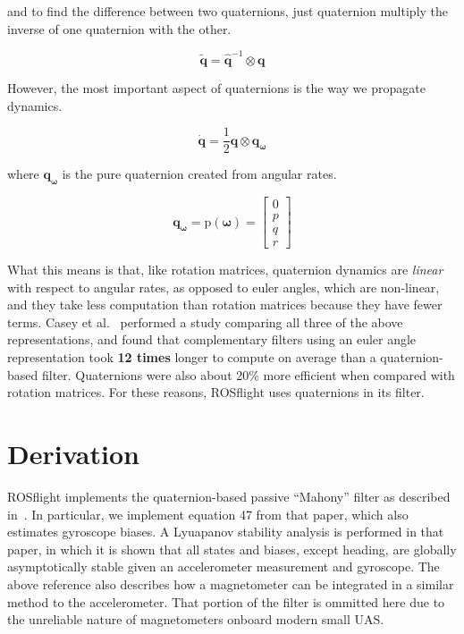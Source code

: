 \documentclass[paper=a4, fontsize=11pt]{scrartcl} %
\numberwithin{equation}{section} %
\numberwithin{figure}{section} %
\numberwithin{table}{section} %
\begin{document}
and to find the difference between two quaternions, just quaternion multiply the inverse of one quaternion with the other.

\begin{equation}
	\tilde{\bm{q}} = \hat{\bm{q}}^{-1} \otimes \bm{q}
\end{equation}

However, the most important aspect of quaternions is the way we propagate dynamics.

\begin{equation}
	\dot{\bm{q}} = \frac{1}{2} \bm{q} \otimes \bm{q_{\omega}}
\end{equation}

where $\bm{q_{\omega}}$ is the pure quaternion created from angular rates.

\begin{equation}
	\bm{q_{\omega}} = \textrm{p}(\bm{\omega}) =
			  \begin{bmatrix}
				0 \\
				p \\
				q \\
				r 
			 \end{bmatrix} 
\end{equation}

What this means is that, like rotation matrices, quaternion dynamics are \textit{linear} with respect to angular rates, as opposed to euler angles, which are non-linear, and they take less computation than rotation matrices because they have fewer terms.  Casey et al.~\cite{Casey2013} performed a study comparing all three of the above representations, and found that complementary filters using an euler angle representation took \textbf{12 times} longer to compute on average than a quaternion-based filter.  Quaternions were also about 20\% more efficient when compared with rotation matrices.  For these reasons, ROSflight uses quaternions in its filter.

\section{Derivation}

ROSflight implements the quaternion-based passive ``Mahony'' filter as described in~\cite{Mahony2007}.  In particular, we implement equation 47 from that paper, which also estimates gyroscope biases.  A Lyuapanov stability analysis is performed in that paper, in which it is shown that all states and biases, except heading, are globally asymptotically stable given an accelerometer measurement and gyroscope.  The above reference also describes how a magnetometer can be integrated in a similar method to the accelerometer.  That portion of the filter is ommitted here due to the unreliable nature of magnetometers onboard modern small UAS.
\end{document}
